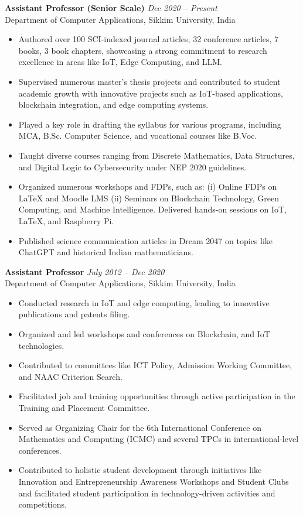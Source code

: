 \documentclass[10pt,a4paper]{article}
\begin{document}
	\textbf{Assistant Professor (Senior Scale)} \hfill \textit{Dec 2020 -- Present}\\
	Department of Computer Applications, Sikkim University, India
	\begin{itemize}[leftmargin=0.2in]
		\item Authored over 100 SCI-indexed journal articles, 32 conference articles, 7 books, 3 book chapters, showcasing a strong commitment to research excellence in areas like IoT, Edge Computing, and LLM.
		\item Supervised numerous master’s thesis projects and contributed to student academic growth with innovative projects such as IoT-based applications, blockchain integration, and edge computing systems.
		\item Played a key role in drafting the syllabus for various programs, including MCA, B.Sc. Computer Science, and vocational courses like B.Voc.
		\item Taught diverse courses ranging from Discrete Mathematics, Data Structures, and Digital Logic to Cybersecurity under NEP 2020 guidelines.
		\item Organized numerous workshops and FDPs, such as: (i) Online FDPs on LaTeX and Moodle LMS (ii) Seminars on Blockchain Technology, Green Computing, and Machine Intelligence.
		Delivered hands-on sessions on IoT, LaTeX, and Raspberry Pi.
		\item Published science communication articles in Dream 2047 on topics like ChatGPT and historical Indian mathematicians.
	\end{itemize}
	
	\textbf{Assistant Professor} \hfill \textit{July 2012 -- Dec 2020}\\
	Department of Computer Applications, Sikkim University, India
	\begin{itemize}[leftmargin=0.2in]
		\item Conducted research in IoT and edge computing, leading to innovative publications and patents filing.
		\item Organized and led workshops and conferences on Blockchain, and IoT technologies.
		\item Contributed to committees like ICT Policy, Admission Working Committee, and NAAC Criterion Search.
		\item Facilitated job and training opportunities through active participation in the Training and Placement Committee.
		\item Served as Organizing Chair for the 6th International Conference on Mathematics and Computing (ICMC) and several TPCs in international-level conferences.
		\item Contributed to holistic student development through initiatives like Innovation and Entrepreneurship Awareness Workshops and Student Clubs and facilitated student participation in technology-driven activities and competitions.
	\end{itemize}
	
\end{document}
